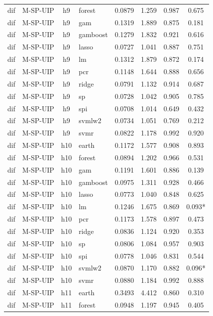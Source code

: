 \begin{ThreePartTable}
\begin{longtable}[t]{llclcccc}
dif & M-SP-UIP & h9 & forest & 0.0879 & 1.259 & 0.987 & 0.675\\
dif & M-SP-UIP & h9 & gam & 0.1319 & 1.889 & 0.875 & 0.181\\
dif & M-SP-UIP & h9 & gamboost & 0.1279 & 1.832 & 0.921 & 0.616\\
dif & M-SP-UIP & h9 & lasso & 0.0727 & 1.041 & 0.887 & 0.751\\
dif & M-SP-UIP & h9 & lm & 0.1312 & 1.879 & 0.872 & 0.174\\
dif & M-SP-UIP & h9 & pcr & 0.1148 & 1.644 & 0.888 & 0.656\\
dif & M-SP-UIP & h9 & ridge & 0.0791 & 1.132 & 0.914 & 0.687\\
dif & M-SP-UIP & h9 & sp & 0.0728 & 1.042 & 0.905 & 0.785\\
dif & M-SP-UIP & h9 & spi & 0.0708 & 1.014 & 0.649 & 0.432\\
dif & M-SP-UIP & h9 & svmlw2 & 0.0734 & 1.051 & 0.769 & 0.212\\
dif & M-SP-UIP & h9 & svmr & 0.0822 & 1.178 & 0.992 & 0.920\\
\addlinespace
dif & M-SP-UIP & h10 & earth & 0.1172 & 1.577 & 0.908 & 0.893\\
dif & M-SP-UIP & h10 & forest & 0.0894 & 1.202 & 0.966 & 0.531\\
dif & M-SP-UIP & h10 & gam & 0.1191 & 1.601 & 0.886 & 0.139\\
dif & M-SP-UIP & h10 & gamboost & 0.0975 & 1.311 & 0.928 & 0.466\\
dif & M-SP-UIP & h10 & lasso & 0.0773 & 1.040 & 0.848 & 0.625\\
dif & M-SP-UIP & h10 & lm & 0.1246 & 1.675 & 0.869 & 0.093*\\
dif & M-SP-UIP & h10 & pcr & 0.1173 & 1.578 & 0.897 & 0.473\\
dif & M-SP-UIP & h10 & ridge & 0.0836 & 1.124 & 0.920 & 0.353\\
dif & M-SP-UIP & h10 & sp & 0.0806 & 1.084 & 0.957 & 0.903\\
dif & M-SP-UIP & h10 & spi & 0.0778 & 1.046 & 0.831 & 0.544\\
dif & M-SP-UIP & h10 & svmlw2 & 0.0870 & 1.170 & 0.882 & 0.096*\\
dif & M-SP-UIP & h10 & svmr & 0.0880 & 1.184 & 0.992 & 0.888\\
\addlinespace
dif & M-SP-UIP & h11 & earth & 0.3493 & 4.412 & 0.860 & 0.310\\
dif & M-SP-UIP & h11 & forest & 0.0948 & 1.197 & 0.945 & 0.405\\

\end{longtable}
\end{ThreePartTable}
